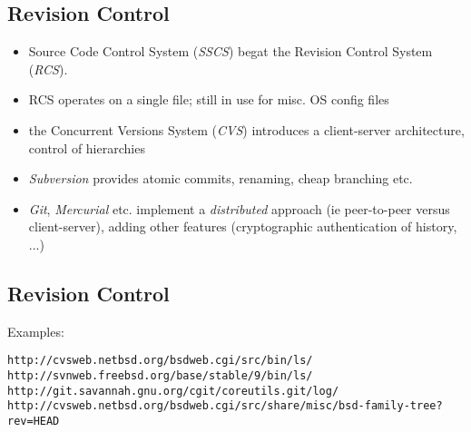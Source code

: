\documentclass[xga]{xdvislides}
\begin{document}
\subsection{Revision Control}
\begin{itemize}
	\item Source Code Control System ({\em SSCS}) begat the Revision
		Control System ({\em RCS}).
	\item RCS operates on a single file; still in use for misc. OS
		config files
	\item the Concurrent Versions System ({\em CVS}) introduces a
		client-server architecture, control of hierarchies
	\item {\em Subversion} provides atomic commits, renaming, cheap
		branching etc.
	\item {\em Git}, {\em Mercurial} etc. implement a {\em
		distributed} approach (ie peer-to-peer versus
		client-server), adding other features (cryptographic
		authentication of history, ...)
\end{itemize}

\subsection{Revision Control}
Examples:

{\tt http://cvsweb.netbsd.org/bsdweb.cgi/src/bin/ls/} \\

{\tt http://svnweb.freebsd.org/base/stable/9/bin/ls/} \\

{\tt http://git.savannah.gnu.org/cgit/coreutils.git/log/} \\

{\tt http://cvsweb.netbsd.org/bsdweb.cgi/src/share/misc/bsd-family-tree?rev=HEAD}

%
%
\end{document}
